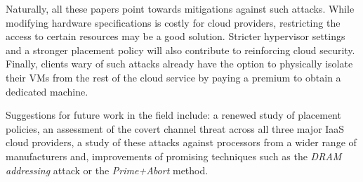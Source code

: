 \documentclass[orivec,envcountsame, a4paper, 11pt]{llncs}
\begin{document}
Naturally, all these papers point towards mitigations against such attacks. While modifying hardware specifications is costly for cloud providers, restricting the access to certain resources may be a good solution. Stricter hypervisor settings and a stronger placement policy will also contribute to reinforcing cloud security. Finally, clients wary of such attacks already have the option to physically isolate their VMs from the rest of the cloud service by paying a premium to obtain a dedicated machine.

Suggestions for future work in the field include: a renewed study of placement policies, an assessment of the covert channel threat across all three major IaaS cloud providers, a study of these attacks against processors from a wider range of manufacturers and, improvements of promising techniques such as the \textit{DRAM addressing} attack or the \textit{Prime+Abort} method.


\newpage



\end{document}
